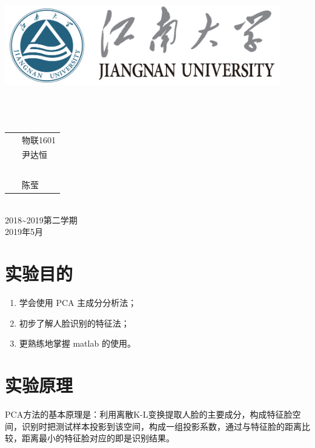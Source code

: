 \documentclass[a4paper]{ctexart}
\begin{document}
\begin{titlepage}
	\begin{center}
		\includegraphics[width=0.9\textwidth]{figure//Njust.png}\\
		\vspace{10mm}
		\textbf{}\\[0.8cm]
		\textbf{}\\[3cm]
		\textbf{}\\[3cm]
		\vspace{\fill}
		\setlength{\extrarowheight}{3mm}
		{\songti{}
			\begin{tabular}{rl}
				{\makebox[4\ccwd][s]{班\qquad 级：}} & ~\kaishu 物联1601   \\
				{\makebox[4\ccwd][s]{姓\qquad 名：}} & ~\kaishu 尹达恒     \\
				{\makebox[4\ccwd][s]{学\qquad 号：}} & ~\kaishu 1030616134 \\
				{\makebox[4\ccwd][s]{指导老师：}}    & ~\kaishu 陈莹       \\
			\end{tabular}
		}\\[2cm]
		\vspace{\fill}
		2018\textasciitilde 2019第二学期\\
		2019年5月
	\end{center}
\end{titlepage}

\renewcommand{\baselinestretch}{1.3}
\section{实验目的}
\begin{enumerate}[label=\arabic*、]
	\item 学会使用 PCA 主成分分析法；
	\item 初步了解人脸识别的特征法；
	\item 更熟练地掌握 matlab 的使用。
\end{enumerate}

\section{实验原理}
PCA方法的基本原理是：利用离散K-L变换提取人脸的主要成分，构成特征脸空间，识别时把测试样本投影到该空间，构成一组投影系数，通过与特征脸的距离比较，距离最小的特征脸对应的即是识别结果。
\end{document}
